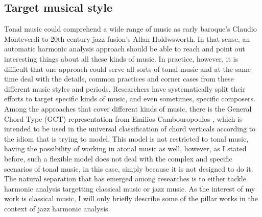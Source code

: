   \subsection{Target musical style}
  Tonal music could comprehend a wide range of music as early baroque's Claudio Monteverdi to 20th century jazz fusion's Allan Holdwsworth. In that sense, an automatic harmonic analysis approach should be able to reach and point out interesting things about all these kinds of music. In practice, however, it is difficult that one approach could serve all sorts of tonal music and at the same time deal with the details, common practices and corner cases from these different music styles and periods. Researchers have systematically split their efforts to target specific kinds of music, and even sometimes, specific composers.
  Among the approaches that cover different kinds of music, there is the General Chord Type (GCT) representation from Emilios Cambouropoulos \cite{cambouropoulos2014idiom}, which is intended to be used in the universal classification of chord verticals according to the idiom that is trying to model. This model is not restricted to tonal music, having the possibility of working in atonal music as well, however, as I stated before, such a flexible model does not deal with the complex and specific scenarios of tonal music, in this case, simply because it is not designed to do it.
  The natural separation that has emerged among researches is to either tackle harmonic analysis targetting classical music or jazz music. As the interest of my work is classical music, I will only briefly describe some of the pillar works in the context of jazz harmonic analysis.
